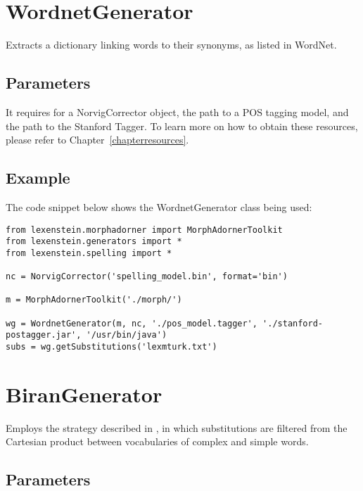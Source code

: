 \section{WordnetGenerator}

Extracts a dictionary linking words to their synonyms, as listed in WordNet. 

\subsection{Parameters}

It requires for a NorvigCorrector object, the path to a POS tagging model, and the path to the Stanford Tagger. To learn more on how to obtain these resources, please refer to Chapter~\ref{chapterresources}.

\subsection{Example}

The code snippet below shows the WordnetGenerator class being used:

\begin{lstlisting}
from lexenstein.morphadorner import MorphAdornerToolkit
from lexenstein.generators import *
from lexenstein.spelling import *

nc = NorvigCorrector('spelling_model.bin', format='bin')

m = MorphAdornerToolkit('./morph/')

wg = WordnetGenerator(m, nc, './pos_model.tagger', './stanford-postagger.jar', '/usr/bin/java')
subs = wg.getSubstitutions('lexmturk.txt')
\end{lstlisting}









\section{BiranGenerator}

Employs the strategy described in \cite{Biran2011}, in which substitutions are filtered from the Cartesian product between vocabularies of complex and simple words.

\subsection{Parameters}

